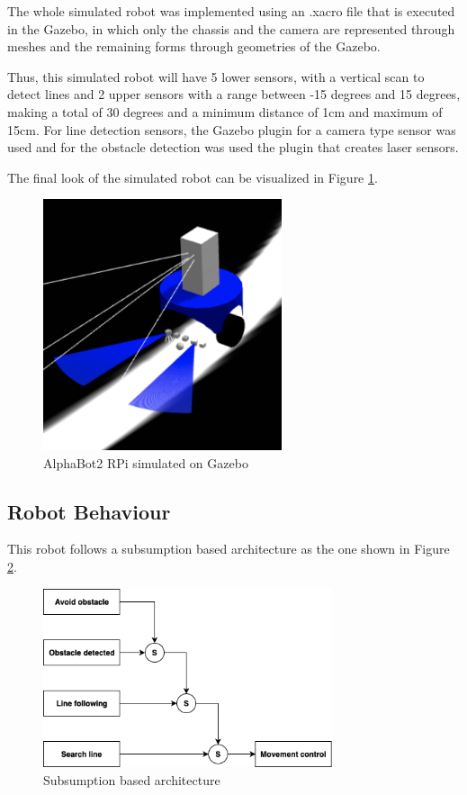 \documentclass[conference]{IEEEtran}
\begin{document}
The whole simulated robot was implemented using an .xacro file that is executed in the Gazebo, in which only the chassis and the camera are represented through meshes and the remaining forms through geometries of the Gazebo.

Thus, this simulated robot will have 5 lower sensors, with a vertical scan to detect lines and 2 upper sensors with a range between -15 degrees and 15 degrees, making a total of 30 degrees and a minimum distance of 1cm and maximum of 15cm. For line detection sensors, the Gazebo plugin for a camera type sensor was used and for the obstacle detection was used the plugin that creates laser sensors.

The final look of the simulated robot can be visualized in Figure \ref{fig:fig4}.

\begin{figure}[H]
    \centering
    \includegraphics[width=7cm]{Simulated-robot.png}
    \caption{AlphaBot2 RPi simulated on Gazebo}
    \label{fig:fig4}
\end{figure}

\subsection{Robot Behaviour} \label{behaviour}

This robot follows a subsumption based architecture as the one shown in Figure \ref{fig:fig5}.

\begin{figure}[H]
    \centering
    \includegraphics[width=8.5cm]{Subsumption.png}
    \caption{Subsumption based architecture}
    \label{fig:fig5}
\end{figure}
\end{document}
